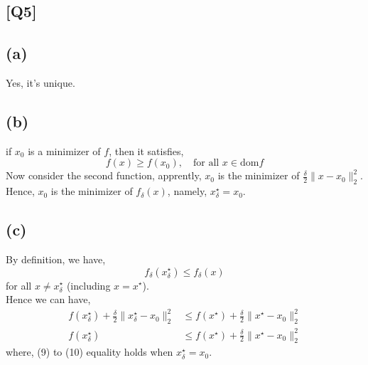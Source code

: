 \documentclass[12pt, a4 paper]{article}
\begin{document}
    \begin{framed}
        \section{[Q5]}
        \subsection{(a)}
        Yes, it's unique.

        \subsection{(b)}
        if $x_{0}$ is a minimizer of $f$, then it satisfies,
        $$
        f(x) \geq f(x_{0}), \quad\text{for all } x \in \text{dom} f
        $$
        \indent Now consider the second function, apprently, $x_{0}$
        is the minimizer of $\frac{\delta}{2} \lVert x-x_{0} \rVert_{2}^{2}$.\\
        \indent Hence, $x_{0}$ is the minimizer of $f_{\delta}{(x)}$, namely,
        $x_{\delta}^{\star} = x_{0}$.

        \subsection{(c)}
        By definition, we have,
        $$
        f_{\delta}(x_{\delta}^{\star}) \leq f_{\delta}(x)
        $$
        \indent for all $x \neq x_{\delta}^{\star}$ (including $x=x^{\star}$).\\
        \indent Hence we can have,
        \begin{align}
            f(x_{\delta}^{\star}) + \frac{\delta}{2} \lVert x_{\delta}^{\star}
             -x_{0} \rVert_{2}^{2} &\leq f(x^{\star}) + \frac{\delta}{2} 
             \lVert x^{\star}-x_{0} \rVert_{2}^{2}\\
            f(x_{\delta}^{\star}) &\leq f(x^{\star}) + \frac{\delta}{2} 
            \lVert x^{\star}-x_{0} \rVert_{2}^{2}
        \end{align}
        \indent where, (9) to (10) equality holds when $x_{\delta}^{\star}=x_{0}$.


\end{framed}
\end{document}

